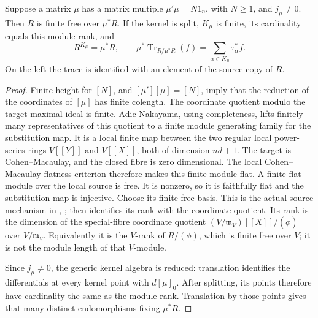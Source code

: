 \begin{srlemma}
\label{lem:ftb-formal-substitution}
Suppose a matrix \(\mu\) has a matrix multiple \(\mu'\mu=N1_n\),
with \(N\ge1\), and \(j_\mu\ne0\).
Then \(R\) is finite free over \(\mu^*R\).
If the kernel is split, \(K_\mu\) is finite, its cardinality equals
this module rank, and
\[
 R^{K_\mu}=\mu^*R,\qquad
 \mu^*\operatorname{Tr}_{R/\mu^*R}(f)
                         =\sum_{\alpha\in K_\mu}\tau_\alpha^*f .
\]
On the left the trace is identified with an element of the source
copy of \(R\).
\end{srlemma}
\begin{proof}
Finite height for \([N]\), and \([\mu'][\mu]=[N]\), imply that the
reduction of the coordinates of \([\mu]\) has finite colength.
The coordinate quotient modulo the target maximal ideal is finite.
Adic Nakayama, using completeness, lifts finitely many representatives
of this quotient to a finite module generating family for the
substitution map.
It is a local finite map between the two regular local power-series
rings \(V[[Y]]\) and \(V[[X]]\), both of dimension \(nd+1\).
The target is Cohen--Macaulay, and the closed fibre is zero
dimensional.  The local Cohen--Macaulay flatness criterion therefore
makes this finite module flat.  A finite flat module over the local
source is free.  It is nonzero, so it is faithfully flat and the
substitution map is injective.
Choose its finite free basis.
This is the actual source mechanism in
,
;
 then identifies
its rank with the coordinate quotient.
Its rank is the dimension of the special-fibre coordinate quotient
\((V/\mathfrak m_V)[[X]]/(\bar\phi)\) over \(V/\mathfrak m_V\).
Equivalently it is the \(V\)-rank of \(R/(\phi)\), which is finite
free over \(V\); it is not the module length of that \(V\)-module.

Since \(j_\mu\ne0\), the generic kernel algebra is reduced:
translation identifies the differentials at every kernel point with
\(d[\mu]_0\).  After splitting, its points therefore have cardinality
the same as the module rank.  Translation by those points gives that
many distinct endomorphisms fixing \(\mu^*R\).


\end{proof}
